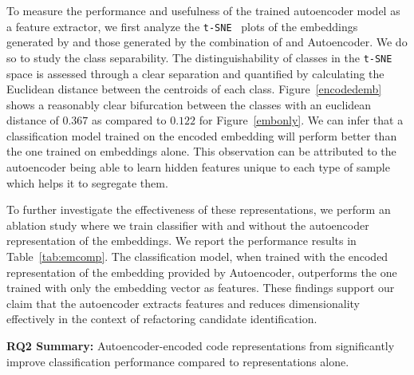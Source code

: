To measure the performance and usefulness of the trained autoencoder model as a feature extractor, we first analyze the \texttt{t-SNE}~\cite{van2008visualizing} plots of the embeddings generated by \GCB{} and those generated by the combination of \GCB{} and Autoencoder. We do so to study the class separability. The distinguishability of classes in the \texttt{t-SNE} space is assessed through a clear separation and quantified by calculating the Euclidean distance between the centroids of each class. Figure~\ref{encodedemb} shows a reasonably clear bifurcation between the classes with an euclidean distance of $0.367$ as compared to $0.122$ for Figure~\ref{embonly}. We can infer that a classification model trained on the encoded embedding will perform better than the one trained on embeddings alone. This observation can be attributed to the autoencoder being able to learn hidden features unique to each type of sample which helps it to segregate them.

To further investigate the effectiveness of these representations, we perform an ablation study where we train classifier with and without the autoencoder representation of the embeddings. 
We report the performance results in Table~\ref{tab:emcomp}.
The \rf{} classification model, when trained with the encoded representation of the embedding provided by Autoencoder, 
outperforms the one trained with only the \GCB{} embedding vector as features. 
These findings support our claim that the
autoencoder extracts features and reduces dimensionality effectively
in the context of refactoring candidate identification.

\begin{boxH}
\textbf{RQ2 Summary:} Autoencoder-encoded code representations from \GCB{} significantly improve classification performance compared to \GCB{} representations alone.
\end{boxH}


